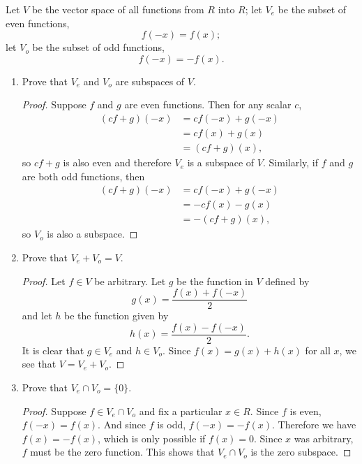  Let $V$ be the vector space of all functions from $R$ into
$R$; let $V_e$ be the subset of even functions,
\begin{equation*}
  f(-x) = f(x);
\end{equation*}
let $V_o$ be the subset of odd functions,
\begin{equation*}
  f(-x) = -f(x).
\end{equation*}
\begin{enumerate}
\item Prove that $V_e$ and $V_o$ are subspaces of $V$.
  \begin{proof}
    Suppose $f$ and $g$ are even functions. Then for any scalar $c$,
    \begin{align*}
      (cf + g)(-x) &= cf(-x) + g(-x) \\
                   &= cf(x) + g(x) \\
                   &= (cf + g)(x),
    \end{align*}
    so $cf + g$ is also even and therefore $V_e$ is a subspace of
    $V$. Similarly, if $f$ and $g$ are both odd functions, then
    \begin{align*}
      (cf + g)(-x) &= cf(-x) + g(-x) \\
                   &= -cf(x) - g(x) \\
                   &= -(cf + g)(x),
    \end{align*}
    so $V_o$ is also a subspace.
  \end{proof}
\item Prove that $V_e + V_o = V$.
  \begin{proof}
    Let $f\in V$ be arbitrary. Let $g$ be the function in $V$ defined by
    \begin{equation*}
      g(x) = \frac{f(x) + f(-x)}2
    \end{equation*}
    and let $h$ be the function given by
    \begin{equation*}
      h(x) = \frac{f(x) - f(-x)}2.
    \end{equation*}
    It is clear that $g\in V_e$ and $h\in V_o$. Since
    $f(x) = g(x) + h(x)$ for all $x$, we see that $V = V_e + V_o$.
  \end{proof}
\item Prove that $V_e\cap V_o = \{0\}$.
  \begin{proof}
    Suppose $f\in V_e\cap V_o$ and fix a particular $x\in R$. Since
    $f$ is even, $f(-x) = f(x)$. And since $f$ is odd,
    $f(-x) = -f(x)$. Therefore we have $f(x) = -f(x)$, which is only
    possible if $f(x) = 0$. Since $x$ was arbitrary, $f$ must be the
    zero function. This shows that $V_e\cap V_o$ is the zero subspace.
  \end{proof}
\end{enumerate}

